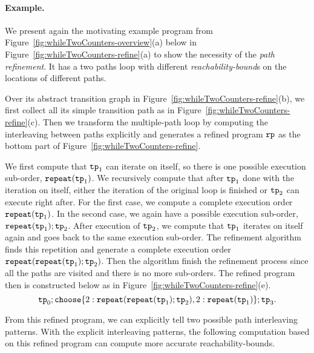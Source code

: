 \paragraph{Example.}

We present again the motivating example program from Figure~\ref{fig:whileTwoCounters-overview}(a)
below in Figure~\ref{fig:whileTwoCounters-refine}(a)
to show the necessity of the \emph{path refinement}. 
It has a two paths loop
with different \emph{reachability-bound}s on the locations of different paths.
%

Over its abstract transition graph in Figure~\ref{fig:whileTwoCounters-refine}(b), we first collect all its simple transition path as in Figure~\ref{fig:whileTwoCounters-refine}(c).
Then we transform the multiple-path loop by computing the interleaving between paths explicitly and
generates a refined program $\mathtt{rp}$ as the bottom part of Figure~\ref{fig:whileTwoCounters-refine}.

We first compute that $\mathtt{tp}_1$ can iterate on itself, so there is one possible execution sub-order,
$\mathtt{repeat}(\mathtt{tp}_1)$.
We recursively compute that after $\mathtt{tp}_1$ done with the iteration on itself,
either the iteration of the original loop is finished
or $\mathtt{tp}_2$ can execute right after.
For the first case, we compute a complete execution order $\mathtt{repeat}(\mathtt{tp}_1)$.
In the second case, we again have a possible execution sub-order, $\mathtt{repeat}(\mathtt{tp}_1); \mathtt{tp}_2$.
After execution of $\mathtt{tp}_2$, we compute that $\mathtt{tp}_1$ iterates on itself again
and goes back to the same execution sub-order. 
The refinement algorithm finds this repetition and generate a complete execution order
$\mathtt{repeat}(\mathtt{repeat}(\mathtt{tp}_1); \mathtt{tp}_2)$.
Then the algorithm finish the refinement process since all the paths are visited and there is no more sub-orders. 
The refined program then is constructed below as in Figure~\ref{fig:whileTwoCounters-refine}(e).
\[
   \tpath_0 ; 
   \rpchoose{2: \rprepeat(\rprepeat(\tpath_1); \tpath_2), 
   2: \rprepeat(\tpath_1)}; \tpath_3.
\]

From this refined program, we can explicitly tell two possible path interleaving patterns.
With the explicit interleaving patterns, the following computation based on this refined program can compute more accurate reachability-bounds.
